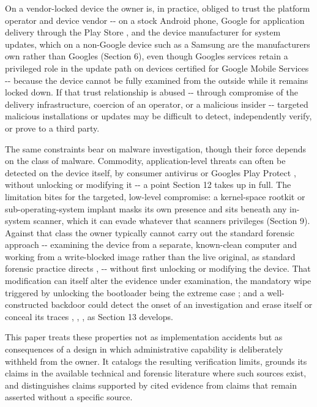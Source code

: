 \documentclass[
]{article}
\begin{document}
On a vendor-locked device the owner is, in practice, obliged to trust
the platform operator and device vendor -\/- on a stock Android phone,
Google for application delivery through the Play Store
\citep{google-play-help}, and the device manufacturer for system
updates, which on a non-Google device such as a Samsung are the
manufacturer\textquotesingle s own rather than Google\textquotesingle s
(Section 6), even though Google\textquotesingle s services retain a
privileged role in the update path on devices certified for Google
Mobile Services \citep{aosp-sepolicy-gmscore} -\/- because the device
cannot be fully examined from the outside while it remains locked down.
If that trust relationship is abused -\/- through compromise of the
delivery infrastructure, coercion of an operator, or a malicious insider
-\/- targeted malicious installations or updates may be difficult to
detect, independently verify, or prove to a third party.

The same constraints bear on malware investigation, though their force
depends on the class of malware. Commodity, application-level threats
can often be detected on the device itself, by consumer antivirus
\citep{kaspersky-android} or Google\textquotesingle s Play Protect
\citep{google-play-protect}, without unlocking or modifying it -\/- a
point Section 12 takes up in full. The limitation bites for the
targeted, low-level compromise: a kernel-space rootkit or
sub-operating-system implant masks its own presence and sits beneath any
in-system scanner, which it can evade whatever that
scanner\textquotesingle s privileges (Section 9). Against that class the
owner typically cannot carry out the standard forensic approach -\/-
examining the device from a separate, known-clean computer and working
from a write-blocked image rather than the live original, as standard
forensic practice directs \citep{nist-sp800-101r1},
\citep{nist-sp800-86} -\/- without first unlocking or modifying the
device. That modification can itself alter the evidence under
examination, the mandatory wipe triggered by unlocking the bootloader
being the extreme case \citep{aosp-bootloader-locking}; and a
well-constructed backdoor could detect the onset of an investigation and
erase itself or conceal its traces \citep{chen-anti-virtualization},
\citep{ruggia-evasive-malware}, \citep{garfinkel-anti-forensics}, as
Section 13 develops.

This paper treats these properties not as implementation accidents but
as consequences of a design in which administrative capability is
deliberately withheld from the owner. It catalogs the resulting
verification limits, grounds its claims in the available technical and
forensic literature where such sources exist, and distinguishes claims
supported by cited evidence from claims that remain asserted without a
specific source.
\end{document}
